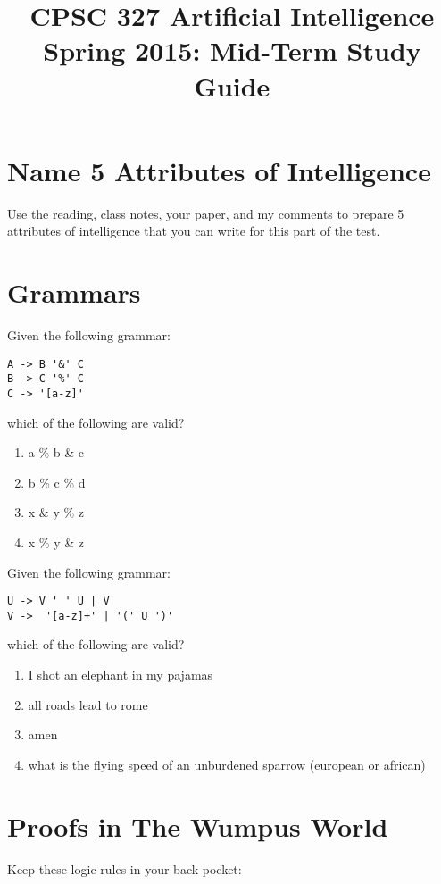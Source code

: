 \documentclass[]{article}
\begin{document}
\title{CPSC 327 Artificial Intelligence Spring 2015: Mid-Term Study Guide}

\maketitle

\section{Name 5 Attributes of Intelligence}
Use the reading, class notes, your paper, and my comments to prepare 5 attributes of intelligence that you can write for this part of the test.
\vspace{1in}
\section{Grammars}
Given the following grammar:
\begin{lstlisting}
A -> B '&' C
B -> C '%' C
C -> '[a-z]'
\end{lstlisting}

which of the following are valid?
\begin{enumerate}
\item a \% b \& c
\item b \% c \% d
\item x \& y \% z
\item x \% y \& z
\end{enumerate}

\newpage

Given the following grammar:
\begin{lstlisting}
U -> V ' ' U | V
V ->  '[a-z]+' | '(' U ')'
\end{lstlisting}

which of the following are valid?
\begin{enumerate}
\item I shot an elephant in my pajamas
\item all roads lead to rome
\item amen
\item what is the flying speed of an unburdened sparrow (european or african)
\end{enumerate}

\section{Proofs in The Wumpus World}
Keep these logic rules in your back pocket:
\end{document}
